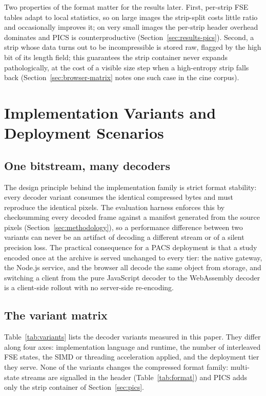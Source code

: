 \documentclass[journal]{IEEEtran}
\begin{document}
Two properties of the format matter for the results later. First, per-strip
FSE tables adapt to local statistics, so on large images the strip-split
costs little ratio and occasionally improves it; on very small images the
per-strip header overhead dominates and PICS is counterproductive
(Section~\ref{sec:results-pics}). Second, a strip whose data turns out to be
incompressible is stored raw, flagged by the high bit of its length field;
this guarantees the strip container never expands pathologically, at the cost
of a visible size step when a high-entropy strip falls back
(Section~\ref{sec:browser-matrix} notes one such case in the cine corpus).

\section{Implementation Variants and Deployment Scenarios}
\label{sec:deployment}

\subsection{One bitstream, many decoders}

The design principle behind the implementation family is strict format
stability: every decoder variant consumes the identical compressed bytes and
must reproduce the identical pixels. The evaluation harness enforces this by
checksumming every decoded frame against a manifest generated from the source
pixels (Section~\ref{sec:methodology}), so a performance difference between
two variants can never be an artifact of decoding a different stream or of a
silent precision loss. The practical consequence for a PACS deployment is
that a study encoded once at the archive is served unchanged to every tier:
the native gateway, the Node.js service, and the browser all decode the same
object from storage, and switching a client from the pure JavaScript decoder
to the WebAssembly decoder is a client-side rollout with no server-side
re-encoding.

\subsection{The variant matrix}

Table~\ref{tab:variants} lists the decoder variants measured in this paper.
They differ along four axes: implementation language and runtime, the number
of interleaved FSE states, the SIMD or threading acceleration applied, and
the deployment tier they serve. None of the variants changes the compressed
format family: multi-state streams are signalled in the header
(Table~\ref{tab:format}) and PICS adds only the strip container of
Section~\ref{sec:pics}.
\end{document}
